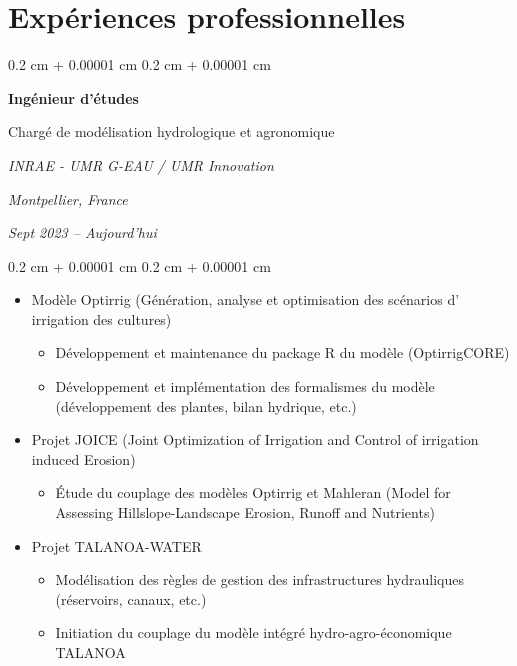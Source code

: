 \documentclass[10pt, letterpaper]{article}
\newenvironment{highlights}{
  \begin{itemize}[
    topsep=0.10 cm,
    parsep=0.10 cm,
    partopsep=0pt,
    itemsep=0pt,
    leftmargin=0.4 cm + 10pt
  ]
}{
  \end{itemize}
} %
\newenvironment{onecolentry}{
  \begin{adjustwidth}{
    0.2 cm + 0.00001 cm
  }{
    0.2 cm + 0.00001 cm
  }
}{
  \end{adjustwidth}
} %
\newenvironment{twocolentry}[2][]{
  \onecolentry
  \def\secondColumn{#2}
  \setcolumnwidth{\fill, 4.5 cm}
  \begin{paracol}{2}
}{
  \switchcolumn \raggedleft \secondColumn
  \end{paracol}
  \endonecolentry
} %
\begin{document}
\section{Expériences professionnelles}

\begin{twocolentry}
{
  \textit{Montpellier, France}
  
  \textit{Sept 2023 – Aujourd'hui}
} {
  \textbf{Ingénieur d'études}

  Chargé de modélisation hydrologique et agronomique

  \textit{INRAE - UMR G-EAU / UMR Innovation}
}
\end{twocolentry}

\vspace{0.10 cm}

\begin{onecolentry}
  \begin{highlights}
    \item{
      Modèle Optirrig (Génération, analyse et optimisation des scénarios d'
      irrigation des cultures)
      \begin{itemize}
        \item Développement et maintenance du package R du modèle (OptirrigCORE)
        \item Développement et implémentation des formalismes du modèle
        (développement des plantes, bilan hydrique, etc.)
      \end{itemize}
    }
    \item{
      Projet JOICE (Joint Optimization of Irrigation and Control of irrigation
      induced Erosion)
      \begin{itemize}
        \item Étude du couplage des modèles Optirrig et Mahleran (Model for
        Assessing Hillslope-Landscape Erosion, Runoff and Nutrients)
      \end{itemize}
    }
    \item{
      Projet TALANOA-WATER
      \begin{itemize}
        \item Modélisation des règles de gestion des infrastructures
        hydrauliques (réservoirs, canaux, etc.)
        \item Initiation du couplage du modèle intégré hydro-agro-économique
        TALANOA
      \end{itemize}
    }
  \end{highlights}
\end{onecolentry}
\end{document}
